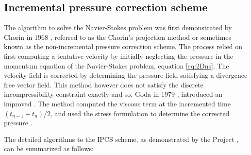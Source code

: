 \subsection{Incremental pressure correction scheme}

The algorithm to solve the Navier-Stokes problem was first demonstrated by Chorin in 1968 \cite{Chorin1968}, referred to as the Chorin's projection method or sometimes known as the non-incremental pressure correction scheme. The process relied on first computing a tentative velocity by initially neglecting the pressure in the momentum equation of the Navier-Stokes problem, equation \ref{eq:2Dns}. The velocity field is corrected by determining the pressure field satisfying a divergence free vector field. This method however does not satisfy the discrete incompressibility constraint exactly and so, Goda in 1979 \cite{Goda1979a}, introduced an improved . The method computed the viscous term at the incremented time $(t_{n-1} + t_n)/2$, and used the stress formulation to determine the corrected pressure \cite{Logg2012b}. 

The detailed algorithms to the IPCS scheme, as demonstrated by the \fenics Project \cite{Logg2012b}, can be summarized as follows:

